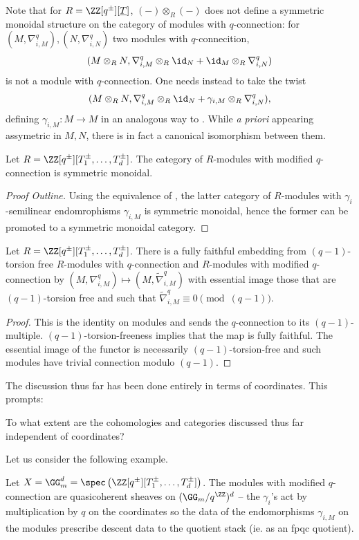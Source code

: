 Note that for $R=\ZZ[q^{\pm}][\underline{T}]$, $(-)\otimes_{R}(-)$ does not define a symmetric monoidal structure on the category of modules with $q$-connection: for $(M,\nabla_{i,M}^{q}),(N,\nabla_{i,N}^{q})$ two modules with $q$-connecition, $$(M\otimes_{R} N,\nabla_{i,M}^{q}\otimes_{R}\id_{N}+\id_{M}\otimes_{R}\nabla_{i,N}^{q})$$ is not a module with $q$-connection. One needs instead to take the twist $$(M\otimes_{R} N,\nabla_{i,M}^{q}\otimes_{R}\id_{N}+\gamma_{i,M}\otimes_{R}\nabla_{i,N}^{q}),$$
defining $\gamma_{i,M}:M\to M$ in an analogous way to . While \emph{a priori} appearing assymetric in $M,N$, there is in fact a canonical isomorphism between them. 
\begin{proposition}
    Let $R=\ZZ[q^{\pm}][T_{1}^{\pm},\dots,T_{d}^{\pm}]$. The category of $R$-modules with modified $q$-connection is symmetric monoidal. 
\end{proposition}
\begin{proof}[Proof Outline]
    Using the equivalence of , the latter category of $R$-modules with $\gamma_{i}$-semilinear endomrophisms $\gamma_{i,M}$ is symmetric monoidal, hence the former can be promoted to a symmetric monoidal category. 
\end{proof}
\begin{proposition}
    Let $R=\ZZ[q^{\pm}][T_{1}^{\pm},\dots,T_{d}^{\pm}]$. There is a fully faithful embedding from $(q-1)$-torsion free $R$-modules with $q$-connection and $R$-modules with modified $q$-connection by $(M,\nabla_{i,M}^{q})\mapsto(M,\widetilde{\nabla}_{i,M}^{q})$ with essential image those that are $(q-1)$-torsion free and such that $\widetilde{\nabla}_{i,M}^{q}\equiv0\pmod{(q-1)}$. 
\end{proposition}
\begin{proof}
    This is the identity on modules and sends the $q$-connection to its $(q-1)$-multiple. $(q-1)$-torsion-freeness implies that the map is fully faithful. The essential image of the functor is necessarily $(q-1)$-torsion-free and such modules have trivial connection modulo $(q-1)$. 
\end{proof}
The discussion thus far has been done entirely in terms of coordinates. This prompts:
\begin{question}
    To what extent are the cohomologies and categories discussed thus far independent of coordinates? 
\end{question}
Let us consider the following example. 
\begin{example}\label{ex: Habiro stack on Gm}
    Let $X=\GG_{m}^{d}=\spec\left(\ZZ[q^{\pm}][T_{1}^{\pm},\dots,T_{d}^{\pm}]\right)$. The modules with modified $q$-connection are quasicoherent sheaves on $(\GG_{m}/q^{\ZZ})^{d}$ -- the $\gamma_{i}$'s act by multiplication by $q$ on the coordinates so the data of the endomorphisms $\gamma_{i,M}$ on the modules prescribe descent data to the quotient stack (ie. as an fpqc quotient).
\end{example}
